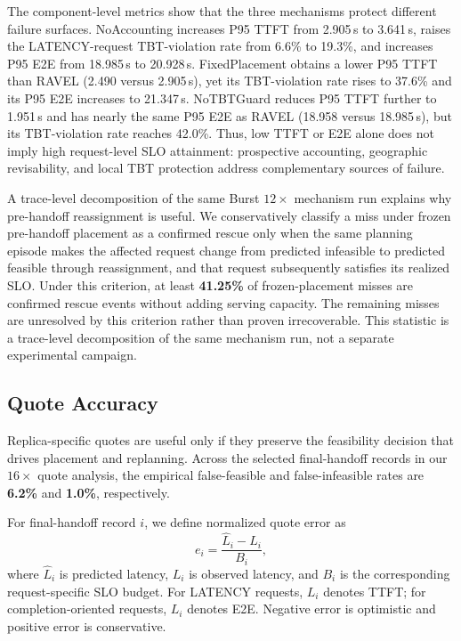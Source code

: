 The component-level metrics show that the three mechanisms protect different
failure surfaces.
NoAccounting increases P95 TTFT from 2.905\,s to 3.641\,s, raises the
LATENCY-request TBT-violation rate from 6.6\% to 19.3\%, and increases P95 E2E
from 18.985\,s to 20.928\,s.
FixedPlacement obtains a lower P95 TTFT than RAVEL
(2.490 versus 2.905\,s), yet its TBT-violation rate rises to 37.6\% and its
P95 E2E increases to 21.347\,s.
NoTBTGuard reduces P95 TTFT further to 1.951\,s and has nearly the same P95 E2E
as RAVEL (18.958 versus 18.985\,s), but its TBT-violation rate reaches 42.0\%.
Thus, low TTFT or E2E alone does not imply high request-level SLO attainment:
prospective accounting, geographic revisability, and local TBT protection
address complementary sources of failure.

A trace-level decomposition of the same Burst $12\times$ mechanism run
explains why pre-handoff reassignment is useful.
We conservatively classify a miss under frozen pre-handoff placement as a
confirmed rescue only when the same planning episode makes the affected
request change from predicted infeasible to predicted feasible through
reassignment, and that request subsequently satisfies its realized SLO.
Under this criterion, at least \textbf{41.25\%} of frozen-placement misses are
confirmed rescue events without adding serving capacity.
The remaining misses are unresolved by this criterion rather than proven
irrecoverable.
This statistic is a trace-level decomposition of the same mechanism run, not a
separate experimental campaign.


\subsection{Quote Accuracy}
\label{sec:eval:quote}

Replica-specific quotes are useful only if they preserve the feasibility
decision that drives placement and replanning.
Across the selected final-handoff records in our $16\times$ quote analysis,
the empirical false-feasible and false-infeasible rates are
\textbf{6.2\%} and \textbf{1.0\%}, respectively.

For final-handoff record $i$, we define normalized quote error as
\[
    e_i =
    \frac{\widehat{L}_i-L_i}{B_i},
\]
where $\widehat{L}_i$ is predicted latency, $L_i$ is observed latency, and
$B_i$ is the corresponding request-specific SLO budget.
For LATENCY requests, $L_i$ denotes TTFT; for completion-oriented requests,
$L_i$ denotes E2E.
Negative error is optimistic and positive error is conservative.

